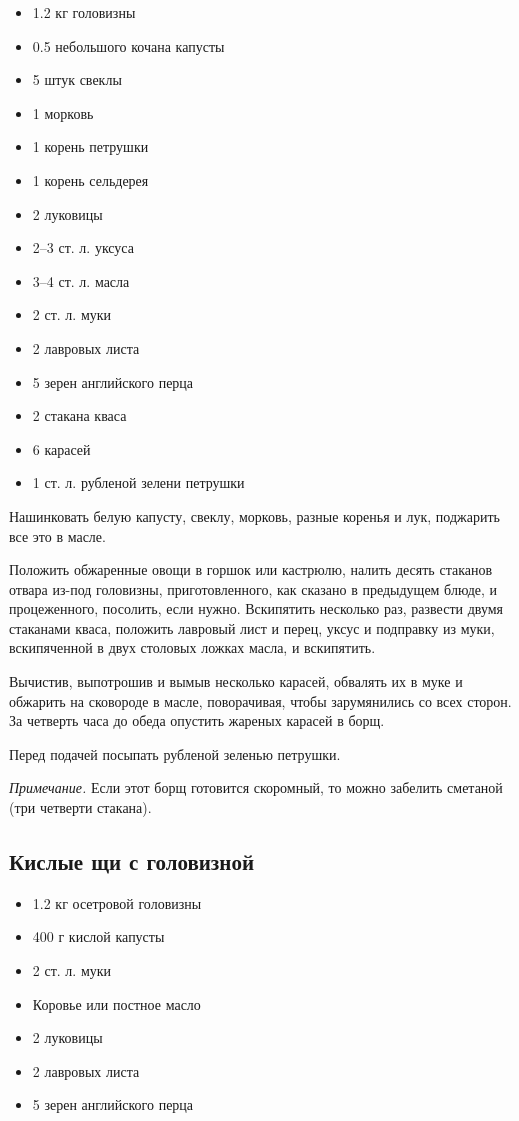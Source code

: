 \begin{itemize}
	\item 1.2 кг головизны
    \item 0.5 небольшого кочана капусты
    \item 5 штук свеклы 
    \item 1 морковь
    \item 1 корень петрушки 
    \item 1 корень сельдерея
    \item 2 луковицы 
    \item 2–3 ст. л. уксуса 
    \item 3–4 ст. л. масла 
    \item 2 ст. л. муки
    \item 2 лавровых листа
    \item 5 зерен английского перца
    \item 2 стакана кваса 
    \item 6 карасей 
    \item 1 ст. л. рубленой зелени петрушки
\end{itemize}

Нашинковать белую капусту, свеклу, морковь, разные коренья и лук, поджарить все это в масле.

Положить обжаренные овощи в горшок или кастрюлю, налить десять стаканов отвара из-под головизны, приготовленного, как сказано в предыдущем блюде, и процеженного, посолить, если нужно. Вскипятить несколько раз, развести двумя стаканами кваса, положить лавровый лист и перец, уксус и подправку из муки, вскипяченной в двух столовых ложках масла, и вскипятить.

Вычистив, выпотрошив и вымыв несколько карасей, обвалять их в муке и обжарить на сковороде в масле, поворачивая, чтобы зарумянились со всех сторон. За четверть часа до обеда опустить жареных карасей в борщ.

Перед подачей посыпать рубленой зеленью петрушки.

\emph{Примечание.} Если этот борщ готовится скоромный, то можно забелить сметаной (три четверти стакана).

\subsection{Кислые щи с головизной}\label{14schi-golovizna}

\begin{itemize}
	\item 1.2 кг осетровой головизны
    \item 400 г кислой капусты
    \item 2 ст. л. муки 
    \item Коровье или постное масло
    \item 2 луковицы 
    \item 2 лавровых листа 
    \item 5 зерен английского перца
\end{itemize}

